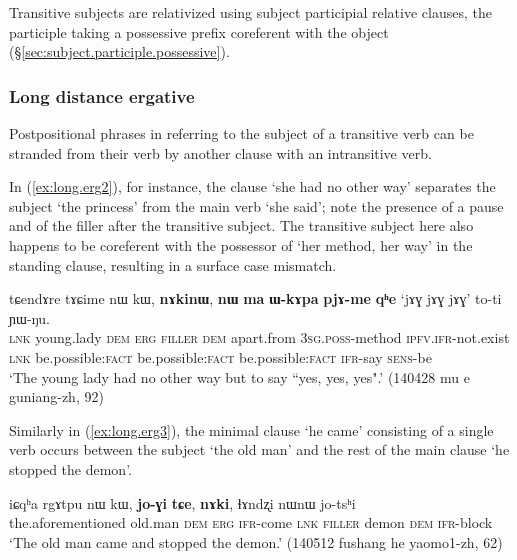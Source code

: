 Transitive subjects are relativized using subject  participial relative clauses, the participle taking a possessive prefix coreferent with the object (§\ref{sec:subject.participle.possessive}). 

\subsubsection{Long distance ergative} \label{sec:long.distance.kW}
Postpositional phrases in  referring to the subject of a transitive verb can be stranded from their verb by another clause with an intransitive verb. 

In (\ref{ex:long.erg2}), for instance, the clause   `she had no other way' separates the subject  `the princess' from the main verb  `she said'; note the presence of a pause and of the filler  after the transitive subject. The transitive subject here also happens to be coreferent with the possessor of  `her method, her way' in the standing clause, resulting in a surface case mismatch.

\begin{exe}
\ex \label{ex:long.erg2}
\gll  tɕendɤre tɤɕime nɯ kɯ, \textbf{nɤkinɯ}, \textbf{nɯ} \textbf{ma} \textbf{ɯ-kɤpa} \textbf{pjɤ-me} \textbf{qʰe} `jɤɣ jɤɣ jɤɣ' 	to-ti ɲɯ-ŋu. \\
\textsc{lnk} young.lady \textsc{dem} \textsc{erg} \textsc{filler} \textsc{dem}  apart.from \textsc{3sg}.\textsc{poss}-method \textsc{ipfv}.\textsc{ifr}-not.exist \textsc{lnk} be.possible:\textsc{fact} be.possible:\textsc{fact} be.possible:\textsc{fact} \textsc{ifr}-say \textsc{sens}-be \\
\glt `The young lady had no other way but to say ``yes, yes, yes".' (140428 mu e guniang-zh, 92)
\end{exe}

Similarly in (\ref{ex:long.erg3}), the minimal clause  `he came' consisting of a single verb occurs between the subject  `the old man' and the rest of the main clause  `he stopped the demon'.

\begin{exe}
\ex \label{ex:long.erg3}
\gll   iɕqʰa rgɤtpu nɯ kɯ, \textbf{jo-ɣi} \textbf{tɕe}, \textbf{nɤki}, ɬɤndʐi nɯnɯ jo-tsʰi  \\
the.aforementioned old.man \textsc{dem} \textsc{erg} \textsc{ifr}-come \textsc{lnk} \textsc{filler} demon \textsc{dem} \textsc{ifr}-block \\
\glt `The old man came and stopped the demon.' (140512 fushang he yaomo1-zh, 62)
\end{exe}

